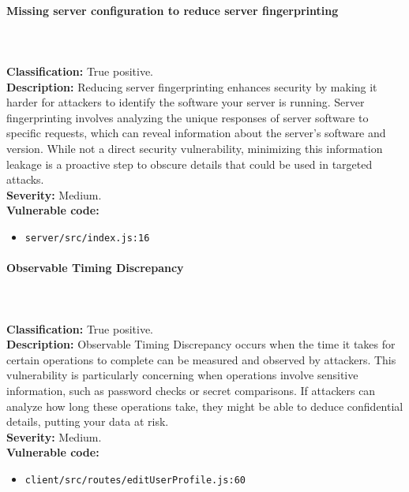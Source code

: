 \documentclass[]{article}
\begin{document}
\paragraph{Missing server configuration to reduce server fingerprinting} \mbox{} \\ \\
\textbf{Classification:} True positive. \\
\textbf{Description:} Reducing server fingerprinting enhances security by making it harder for attackers to identify the software your server is running. Server fingerprinting involves analyzing the unique responses of server software to specific requests, which can reveal information about the server's software and version. While not a direct security vulnerability, minimizing this information leakage is a proactive step to obscure details that could be used in targeted attacks. \\ 
\textbf{Severity:} Medium. \\ 
\textbf{Vulnerable code:}
\begin{itemize}
    \item \texttt{server/src/index.js:16}
\end{itemize}

\paragraph{Observable Timing Discrepancy} \mbox{} \\ \\
\textbf{Classification:} True positive. \\
\textbf{Description:} Observable Timing Discrepancy occurs when the time it takes for certain operations to complete can be measured and observed by attackers. This vulnerability is particularly concerning when operations involve sensitive information, such as password checks or secret comparisons. If attackers can analyze how long these operations take, they might be able to deduce confidential details, putting your data at risk. \\ 
\textbf{Severity:} Medium. \\ 
\textbf{Vulnerable code:}
\begin{itemize}
    \item \texttt{client/src/routes/editUserProfile.js:60}
\end{itemize}
\end{document}
